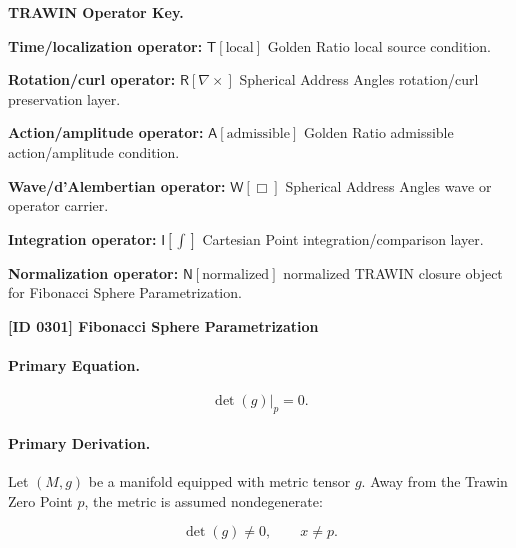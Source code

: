 \par\vspace{0.45\baselineskip}
\noindent\begin{minipage}[t]{\linewidth}
\begingroup
\small
\raggedright
\textbf{TRAWIN Operator Key.}\par
\noindent\textbf{Time/localization operator:} $\mathsf{T}\!\left[\mathrm{local}\right]$ Golden Ratio local source condition.\par
\noindent\textbf{Rotation/curl operator:} $\mathsf{R}\!\left[\nabla\times\right]$ Spherical Address Angles rotation/curl preservation layer.\par
\noindent\textbf{Action/amplitude operator:} $\mathsf{A}\!\left[\mathrm{admissible}\right]$ Golden Ratio admissible action/amplitude condition.\par
\noindent\textbf{Wave/d'Alembertian operator:} $\mathsf{W}\!\left[\Box\right]$ Spherical Address Angles wave or operator carrier.\par
\noindent\textbf{Integration operator:} $\mathsf{I}\!\left[\int\right]$ Cartesian Point integration/comparison layer.\par
\noindent\textbf{Normalization operator:} $\mathsf{N}\!\left[\mathrm{normalized}\right]$ normalized TRAWIN closure object for Fibonacci Sphere Parametrization.\par
\endgroup
\end{minipage}

\clearpage
\noindent\textbf{[ID 0301] Fibonacci Sphere Parametrization}\par
\vspace{0.35em}
\paragraph{Primary Equation.}
\begin{equation}
\det(g)\big|_{p}=0 .
\end{equation}

\paragraph{Primary Derivation.}
Let $(M,g)$ be a manifold equipped with metric tensor $g$. Away from the Trawin Zero Point $p$, the metric is assumed nondegenerate:

\begin{equation}
\det(g)\neq 0,
\qquad x\neq p .
\end{equation}

